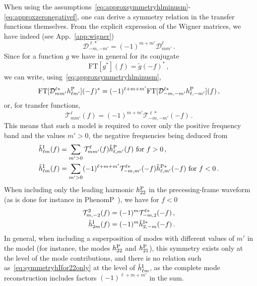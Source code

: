 \documentclass[aps,showpacs,twocolumn,
prd,superscriptaddress,nofootinbib]{revtex4-1}
\newcommand{\be}{\begin{equation}}
\newcommand{\ee}{\end{equation}}
\newcommand\calT{{\mathcal{T}}}
\newcommand\calD{{\mathcal{D}}}
\newcommand{\nn}{\nonumber}
\begin{document}
When using the assumptions~\eqref{eq:approxsymmetryhlminusm}-\eqref{eq:approxzeronegativef}, one can derive a symmetry relation in the transfer functions themselves. From the explicit expression of the Wigner matrices, we have indeed (see App.~\ref{app:wigner})
\be
	\calD^{\ell *}_{-m,-m'} = (-1)^{m+m'}\calD^{\ell}_{mm'} \,.
\ee
Since for a function $g$ we have in general for its conjugate
\be
	\mathrm{FT}[g^{*}](f) = \tilde{g}(-f)^{*} \,,
\ee
we can write, using~\eqref{eq:approxsymmetryhlminusm},
\be
	\mathrm{FT}[\calD^{\ell *}_{mm'} h_{\ell m'}^{\rm P}](-f)^{*} = (-1)^{\ell+m+m'} \mathrm{FT}[\calD^{\ell *}_{-m,-m'} h_{\ell, -m'}^{\rm P}](f) \,,
\ee
or, for transfer functions,
\be
	\calT^{\ell}_{mm'}(f) = (-1)^{m+m'} \calT^{\ell *}_{-m,-m'}(-f) \,.
\ee
This means that such a model is required to cover only the positive frequency band and the values $m'>0$, the negative frequencies being deduced from
\begin{align}
	\tilde{h}^{\rm I}_{\ell m}(f) &= \sum_{m'>0} \calT^{\ell}_{mm'}(f) \tilde{h}^{\rm P}_{\ell, m'}(f) \text{ for } f>0 \,, \nn\\
	\tilde{h}^{\rm I}_{\ell m}(f) &= \sum_{m'>0} (-1)^{\ell+m+m'} \calT^{\ell *}_{-m,m'}(-f) \tilde{h}^{\rm P *}_{\ell, m'}(-f) \text{ for } f<0 \,.
\end{align}
When including only the leading harmonic $h^{\rm P}_{22}$ in the precessing-frame waveform (as is done for instance in PhenomP~\cite{Hannam+13}), we have for $f<0$
\begin{subequations}
\begin{align}
	\calT^{2}_{m,-2}(f) &= (-1)^{m} \calT^{\ell *}_{-m,2}(-f) \,, \\
	\tilde{h}^{\rm I}_{2 m}(f) &= (-1)^{m} \tilde{h}^{\rm I *}_{2,-m}(-f) \,. \label{eq:symmetryhIfor22only}
\end{align}
\end{subequations}
In general, when including a superposition of modes with different values of $m'$ in the model (for instance, the modes $h^{\rm P}_{22}$ and $h^{\rm P}_{21}$), this symmetry exists only at the level of the mode contributions, and there is no relation such as~\eqref{eq:symmetryhIfor22only}  at the level of $\tilde{h}^{\rm I}_{\ell m}$, as the complete mode reconstruction includes factors $(-1)^{\ell+m+m'}$ in the sum.
\end{document}
